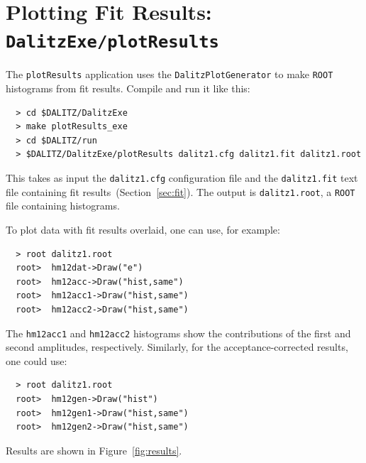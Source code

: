 \documentclass[11pt]{article}
\begin{document}
\section{Plotting Fit Results: \\
{\tt DalitzExe/plotResults}}

The {\tt plotResults} application uses the {\tt DalitzPlotGenerator} to make {\tt ROOT} histograms from fit results.  Compile and run it like this:
\begin{verbatim}
  > cd $DALITZ/DalitzExe
  > make plotResults_exe
  > cd $DALITZ/run
  > $DALITZ/DalitzExe/plotResults dalitz1.cfg dalitz1.fit dalitz1.root
\end{verbatim}
This takes as input the {\tt dalitz1.cfg} configuration file and the {\tt dalitz1.fit} text file containing fit results~(Section~\ref{sec:fit}).  The output is {\tt dalitz1.root}, a {\tt ROOT} file containing histograms.

To plot data with fit results overlaid, one can use, for example:
\begin{verbatim}
  > root dalitz1.root
  root>  hm12dat->Draw("e")
  root>  hm12acc->Draw("hist,same")
  root>  hm12acc1->Draw("hist,same")
  root>  hm12acc2->Draw("hist,same")
\end{verbatim}
The {\tt hm12acc1} and {\tt hm12acc2} histograms show the contributions of the first and second amplitudes, respectively.  Similarly, for the acceptance-corrected results, one could use:
\begin{verbatim}
  > root dalitz1.root
  root>  hm12gen->Draw("hist")
  root>  hm12gen1->Draw("hist,same")
  root>  hm12gen2->Draw("hist,same")
\end{verbatim}

Results are shown in Figure~\ref{fig:results}.
\end{document}
